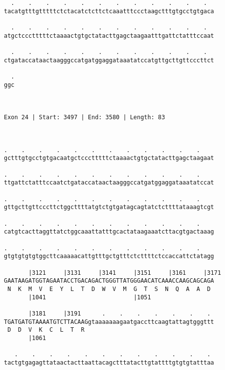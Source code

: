 \documentclass{article}
\begin{document}
\begin{Verbatim}
  .    .    .    .    .    .    .    .    .    .    .    .  
tacatgtttgtttttctctacatctcttctcaaatttccctaagctttgtgcctgtgaca
                                                            
  .    .    .    .    .    .    .    .    .    .    .    .  
atgctccctttttctaaaactgtgctatacttgagctaagaatttgattctatttccaat
                                                            
  .    .    .    .    .    .    .    .    .    .    .    .  
ctgataccataactaagggccatgatggaggataaatatccatgttgcttgttcccttct
                                                            
  .
ggc
   
   
 
Exon 24 | Start: 3497 | End: 3580 | Length: 83



.    .    .    .    .    .    .    .    .    .    .    .    
gctttgtgcctgtgacaatgctccctttttctaaaactgtgctatacttgagctaagaat
                                                            
.    .    .    .    .    .    .    .    .    .    .    .    
ttgattctatttccaatctgataccataactaagggccatgatggaggataaatatccat
                                                            
.    .    .    .    .    .    .    .    .    .    .    .    
gttgcttgttcccttctggcttttatgtctgtgatagcagtatctcttttataaagtcgt
                                                            
.    .    .    .    .    .    .    .    .    .    .    .    
catgtcacttaggttatctggcaaattatttgcactataagaaatcttacgtgactaaag
                                                            
.    .    .    .    .    .    .    .    .    .    .    .    
gtgtgtgtgtggcttcaaaaacattgtttgctgtttctcttttctccaccattctatagg
                                                            
       |3121     |3131     |3141     |3151     |3161     |3171
GAATAAGATGGTAGAATACCTGACAGACTGGGTTATGGGAACATCAAACCAAGCAGCAGA
 N  K  M  V  E  Y  L  T  D  W  V  M  G  T  S  N  Q  A  A  D 
       |1041                         |1051                  
  
       |3181     |3191      .    .    .    .    .    .    . 
TGATGATGTAAAATGTCTTACAAGgtaaaaaaagaatgaccttcaagtattagtgggttt
 D  D  V  K  C  L  T  R                                     
       |1061                                                
  
   .    .    .    .    .    .    .    .    .    .    .    . 
tactgtgagagttataactacttaattacagctttatacttgtattttgtgtgtatttaa
                                                            

\end{Verbatim}
\end{document}
